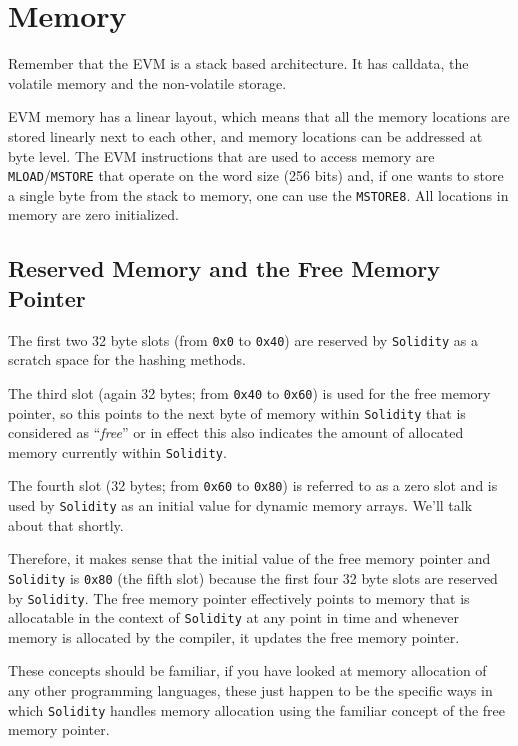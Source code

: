 \section{Memory}\label{memory}

Remember that the EVM is a stack based architecture. It has calldata,
the volatile memory and the non-volatile storage.

EVM memory has a linear layout, which means that all the memory
locations are stored linearly next to each other, and memory locations
can be addressed at byte level. The EVM instructions that are used to
access memory are \texttt{MLOAD}/\texttt{MSTORE} that operate on the
word size (256 bits) and, if one wants to store a single byte from the
stack to memory, one can use the \texttt{MSTORE8}. All locations in
memory are zero initialized.

\subsection{Reserved Memory and the Free Memory
Pointer}\label{reserved-memory-and-the-free-memory-pointer}

The first two 32 byte slots (from \texttt{0x0} to \texttt{0x40}) are
reserved by \texttt{Solidity} as a scratch space for the hashing
methods.

The third slot (again 32 bytes; from \texttt{0x40} to \texttt{0x60}) is
used for the free memory pointer, so this points to the next byte of
memory within \texttt{Solidity} that is considered as ``\emph{free}'' or
in effect this also indicates the amount of allocated memory currently
within \texttt{Solidity}.

The fourth slot (32 bytes; from \texttt{0x60} to \texttt{0x80}) is
referred to as a zero slot and is used by \texttt{Solidity} as an
initial value for dynamic memory arrays. We'll talk about that shortly.

Therefore, it makes sense that the initial value of the free memory
pointer and \texttt{Solidity} is \texttt{0x80} (the fifth slot) because
the first four 32 byte slots are reserved by \texttt{Solidity}. The free
memory pointer effectively points to memory that is allocatable in the
context of \texttt{Solidity} at any point in time and whenever memory is
allocated by the compiler, it updates the free memory pointer.

These concepts should be familiar, if you have looked at memory
allocation of any other programming languages, these just happen to be
the specific ways in which \texttt{Solidity} handles memory allocation
using the familiar concept of the free memory pointer.


